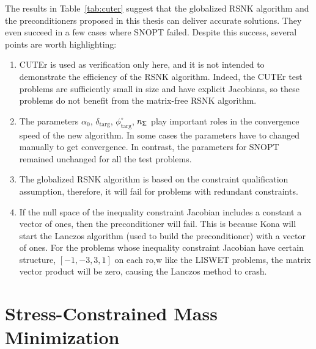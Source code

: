 The results in Table~\ref{tab:cuter} suggest 
that the globalized RSNK algorithm and the preconditioners proposed in this thesis can deliver accurate solutions. They even succeed in a few cases where SNOPT failed. Despite this success, several points are worth highlighting:
\begin{enumerate}
\item CUTEr is used as verification only here, and it is not intended to demonstrate the efficiency of the RSNK algorithm.  Indeed, the CUTEr test problems are sufficiently small in size and have explicit Jacobians, so these problems do not benefit from the matrix-free RSNK algorithm.

\item The parameters \textbf{$\alpha_0$},  $\delta_{\text{targ}}$, $\phi^{\circ}_{\text{targ}}$,  $n_{\mathsf{\Sigma}}$ play important roles in the convergence speed of the new algorithm. In some cases the parameters have to changed manually to get convergence. In contrast, the parameters for SNOPT remained unchanged for all the test problems. 
\item The globalized RSNK algorithm is based on the constraint qualification assumption, therefore, it will fail for problems with redundant constraints.    
\item If the null space of the inequality constraint Jacobian includes a constant   a vector of ones, then the preconditioner will fail. This is because Kona will start the Lanczos algorithm (used to build the preconditioner) with a vector of ones.
 For the problems whose inequality constraint Jacobian have certain structure, \eg $[-1, -3, 3, 1]$ on each ro,w like the LISWET problems, the matrix vector product will be zero, causing the Lanczos method to crash. 
\end{enumerate} 





\section{Stress-Constrained Mass Minimization}\label{sec:fstopo2}
